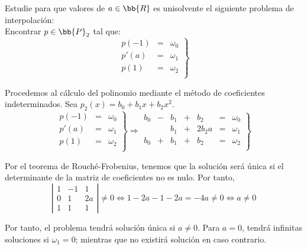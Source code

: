 \begin{ejercicio}    
    Estudie para que valores de $a\in \bb{R}$ es unisolvente el siguiente problema de interpolación:\\
    Encontrar $p\in \bb{P}_2$ tal que:
    \begin{equation*}
        \left.\begin{array}{ccc}
            p(-1) &=& \omega_0  \\
            p'(a) &=& \omega_1  \\
            p(1) &=& \omega_2  \\
        \end{array}\right\}
    \end{equation*}

    Procedemos al cálculo del polinomio mediante el método de coeficientes indeterminados. Sea $p_2(x)=b_0 + b_1x + b_2x^2$.
    \begin{equation*}
        \left.\begin{array}{ccc}
            p(-1) &=& \omega_0  \\
            p'(a) &=& \omega_1  \\
            p(1) &=& \omega_2  \\
        \end{array}\right\}
        \Longrightarrow
        \left.\begin{array}{rrrrrcc}
            b_0&-&b_1& +&b_2 &=& \omega_0  \\
            &&b_1&+&2b_2a &=& \omega_1  \\
            b_0&+&b_1&+&b_2 &=& \omega_2  \\
        \end{array}\right\}
    \end{equation*}

    Por el teorema de Rouché-Frobenius, tenemos que la solución será única si el determinante de la matriz de coeficientes no es nulo. Por tanto,
    \begin{equation*}
        \left|\begin{array}{ccc}
            1 & -1 & 1 \\
            0 & 1 & 2a \\
            1 & 1 & 1
        \end{array}\right| \neq 0
        \Longleftrightarrow 1-2a-1-2a = -4a \neq 0\Longleftrightarrow a\neq 0
    \end{equation*}

    Por tanto, el problema tendrá solución única si $a\neq 0$. Para $a=0$, tendrá infinitas soluciones si $\omega_1=0$; mientras que no existirá solución en caso contrario.
\end{ejercicio}


